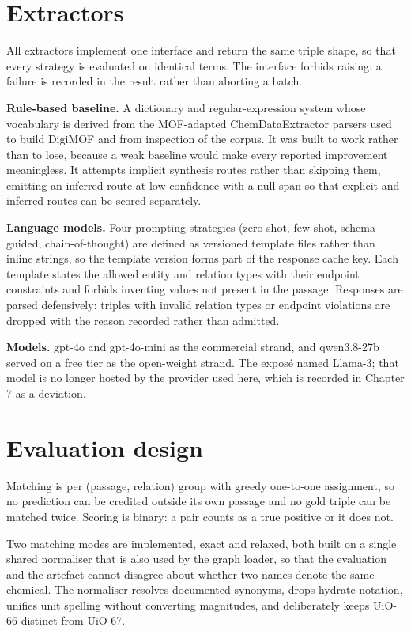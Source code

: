 \documentclass[11pt,a4paper,oneside]{report}
\begin{document}
\section{Extractors}

All extractors implement one interface and return the same triple shape, so that every strategy is evaluated on identical terms. The interface forbids raising: a failure is recorded in the result rather than aborting a batch.

\textbf{Rule-based baseline.} A dictionary and regular-expression system whose vocabulary is derived from the MOF-adapted ChemDataExtractor parsers used to build DigiMOF and from inspection of the corpus. It was built to work rather than to lose, because a weak baseline would make every reported improvement meaningless. It attempts implicit synthesis routes rather than skipping them, emitting an inferred route at low confidence with a null span so that explicit and inferred routes can be scored separately.

\textbf{Language models.} Four prompting strategies (zero-shot, few-shot, schema-guided, chain-of-thought) are defined as versioned template files rather than inline strings, so the template version forms part of the response cache key. Each template states the allowed entity and relation types with their endpoint constraints and forbids inventing values not present in the passage. Responses are parsed defensively: triples with invalid relation types or endpoint violations are dropped with the reason recorded rather than admitted.

\textbf{Models.} gpt-4o and gpt-4o-mini as the commercial strand, and qwen3.8-27b served on a free tier as the open-weight strand. The exposé named Llama-3; that model is no longer hosted by the provider used here, which is recorded in Chapter 7 as a deviation.

\section{Evaluation design}

Matching is per (passage, relation) group with greedy one-to-one assignment, so no prediction can be credited outside its own passage and no gold triple can be matched twice. Scoring is binary: a pair counts as a true positive or it does not.

Two matching modes are implemented, exact and relaxed, both built on a single shared normaliser that is also used by the graph loader, so that the evaluation and the artefact cannot disagree about whether two names denote the same chemical. The normaliser resolves documented synonyms, drops hydrate notation, unifies unit spelling without converting magnitudes, and deliberately keeps UiO-66 distinct from UiO-67.
\end{document}
